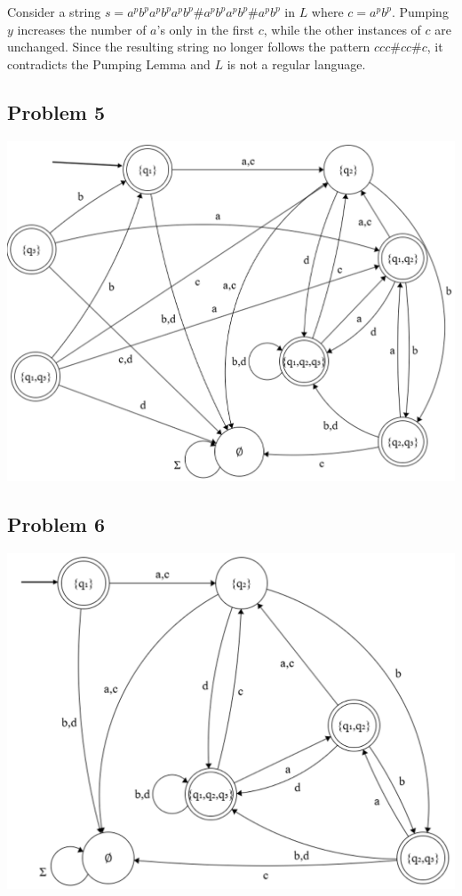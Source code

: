 \documentclass{article}
\begin{document}
Consider a string $s=a^p b^p a^p b^p a^p b^p\#a^p b^p a^p b^p\#a^p b^p$ in $L$ where $c=a^p b^p$. Pumping $y$ increases the number of $a$'s only in the first $c$, while the other instances of $c$ are unchanged. Since the resulting string no longer follows the pattern $ccc\#cc\#c$, it contradicts the Pumping Lemma and $L$ is not a regular language.
\subsection*{Problem 5}

\begin{center}
    \includegraphics[scale=0.36]{exam1-2.png}
\end{center}

\subsection*{Problem 6}

\begin{center}
    \includegraphics[scale=0.38]{exam1-3.png}
\end{center}
\end{document}
